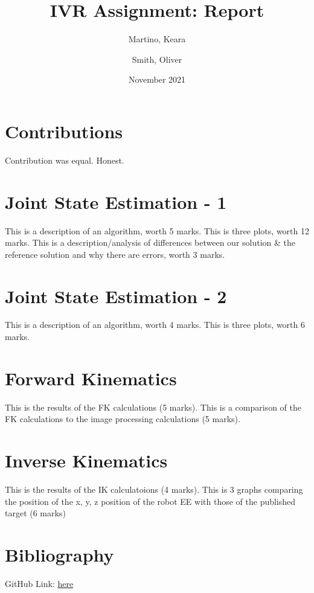 \documentclass{article}
\title{IVR Assignment: Report}
\author{
  Martino, Keara\\
  \and
  Smith, Oliver\\
}
\date{November 2021}
\begin{document}
\maketitle

\section{Contributions}
Contribution was equal. Honest.
\section{Joint State Estimation -  1}
This is a description of an algorithm, worth 5 marks.
\hfill\break
This is three plots, worth 12 marks.
\hfill\break
This is a description/analysis of differences between our solution \& the reference solution and why there are errors, worth 3 marks.
\section{Joint State Estimation -  2}
This is a description of an algorithm, worth 4 marks.
\hfill\break
This is three plots, worth 6 marks.
\section{Forward Kinematics}
This is the results of the FK calculations (5 marks).
\hfill\break
This is a comparison of the FK calculations to the image processing calculations (5 marks).
\section{Inverse Kinematics}
This is the results of the IK calculatoions (4 marks).
\hfill\break
This is 3 graphs comparing the position of the x, y, z position of the robot EE with those of the published target (6 marks)
\section{Bibliography}
GitHub Link:
\href{https://github.com/01smito01/ivr_assignment}{here}
\end{document}
